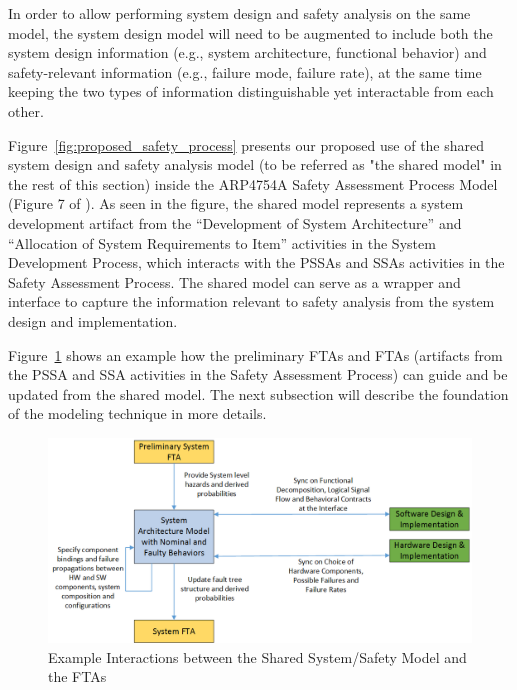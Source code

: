 In order to allow performing system design and safety analysis on the same model, the system design model will need to be augmented to include both the system design information (e.g., system architecture, functional behavior) and safety-relevant information (e.g., failure mode, failure rate), at the same time keeping the two types of information distinguishable yet interactable from each other.

Figure~\ref{fig:proposed_safety_process} presents our proposed use of the shared system design and safety analysis model (to be referred as "the shared model" in the rest of this section) inside the ARP4754A Safety Assessment Process Model (Figure 7 of \cite{SAE:ARP4754A}). As seen in the figure, the shared model represents a system development artifact from the ``Development of System Architecture'' and ``Allocation of System Requirements to Item'' activities in the System Development Process, which interacts with the PSSAs and SSAs activities in the Safety Assessment Process. The shared model can serve as a wrapper and interface to capture the information relevant to safety analysis from the system design and implementation.

Figure~\ref{fig:interaction_with_FTA} shows an example how the preliminary FTAs and FTAs (artifacts from the PSSA and SSA activities in the Safety Assessment Process) can guide and be updated from the shared model. The next subsection will describe the foundation of the modeling technique in more details.

\begin{figure}[h!]
	\vspace{-0.19in}
	\begin{center}
		\includegraphics[width=1.0\textwidth]{images/FTA_MBD_Workflow.png}
	\end{center}
	\caption{Example Interactions between the Shared System/Safety Model and  the FTAs}
	\label{fig:interaction_with_FTA}
\end{figure}


